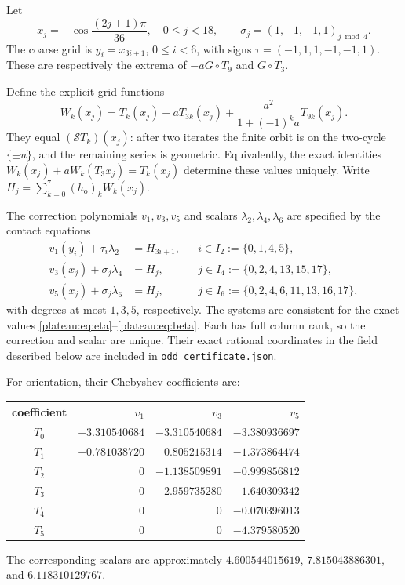 \documentclass[11pt]{article}
\theoremstyle{remark}\newtheorem{remark}[theorem]{Remark}
\begin{document}
Let
\[
 x_j=-\cos\frac{(2j+1)\pi}{36},\quad0\le j<18,\qquad
 \sigma_j=(1,-1,-1,1)_{j\bmod4}.
\]
The coarse grid is $y_i=x_{3i+1}$, $0\le i<6$, with signs
$\tau=(-1,1,1,-1,-1,1)$. These are respectively the extrema of
$-aG\circ T_9$ and $G\circ T_3$.

Define the explicit grid functions
\[
 W_k(x_j)=T_k(x_j)-aT_{3k}(x_j)
        +\frac{a^2}{1+(-1)^ka}T_{9k}(x_j).
\]
They equal $(\mathcal S T_k)(x_j)$: after two iterates the finite orbit
is on the two-cycle $\{\pm u\}$, and the remaining series is geometric.
Equivalently, the exact identities
$W_k(x_j)+aW_k(T_3x_j)=T_k(x_j)$ determine these values uniquely.
Write $H_j=\sum_{k=0}^7(h_{\mathrm{o}})_k W_k(x_j)$.

The correction polynomials $v_1,v_3,v_5$ and scalars
$\lambda_2,\lambda_4,\lambda_6$ are specified by the contact equations
\begin{align*}
 v_1(y_i)+\tau_i\lambda_2&=H_{3i+1},
       &&i\in I_2:=\{0,1,4,5\},\\
 v_3(x_j)+\sigma_j\lambda_4&=H_j,
       &&j\in I_4:=\{0,2,4,13,15,17\},\\
 v_5(x_j)+\sigma_j\lambda_6&=H_j,
       &&j\in I_6:=\{0,2,4,6,11,13,16,17\},
\end{align*}
with degrees at most $1,3,5$, respectively. The systems are consistent
for the exact values \eqref{plateau:eq:eta}--\eqref{plateau:eq:beta}. Each has full column
rank, so the correction and scalar are unique. Their exact rational
coordinates in the field described below are included in
\texttt{odd\_certificate.json}.

For orientation, their Chebyshev coefficients are:
\begin{center}\small
\begin{tabular}{c r r r}
\toprule
coefficient & $v_1$ & $v_3$ & $v_5$\\\midrule
$T_0$&$-3.310540684$&$-3.310540684$&$-3.380936697$\\
$T_1$&$-0.781038720$&$ 0.805215314$&$-1.373864474$\\
$T_2$&$0$&$-1.138509891$&$-0.999856812$\\
$T_3$&$0$&$-2.959735280$&$ 1.640309342$\\
$T_4$&$0$&$0$&$-0.070396013$\\
$T_5$&$0$&$0$&$-4.379580520$\\\bottomrule
\end{tabular}
\end{center}
The corresponding scalars are approximately
$4.600544015619$, $7.815043886301$, and $6.118310129767$.
\end{document}
